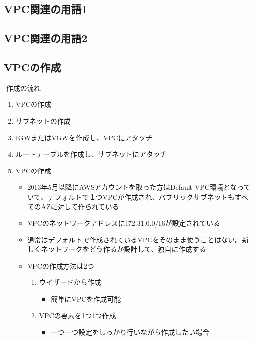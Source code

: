 \documentclass[11pt]{article}
\begin{document}
\subsection{VPC関連の用語1}
\label{sec-1-3}
\subsection{VPC関連の用語2}
\label{sec-1-4}
\subsection{VPCの作成}
\label{sec-1-5}

  -作成の流れ
\begin{enumerate}
\item VPCの作成
\item サブネットの作成
\item IGWまたはVGWを作成し、VPCにアタッチ
\item ルートテーブルを作成し、サブネットにアタッチ
\item VPCの作成
\begin{itemize}
\item 2013年5月以降にAWSアカウントを取った方はDefault VPC環境となっていて、デフォルトで１つVPCが作成され、パブリックサブネットもすべてのAZに対して作られている
\item VPCのネットワークアドレスに172.31.0.0/16が設定されている
\item 通常はデフォルトで作成されているVPCをそのまま使うことはない。新しくネットワークをどう作るか設計して、独自に作成する
\item VPCの作成方法は2つ
\begin{enumerate}
\item ウイザードから作成
\begin{itemize}
\item 簡単にVPCを作成可能
\end{itemize}
\item VPCの要素を1つ1つ作成
\begin{itemize}
\item 一つ一つ設定をしっかり行いながら作成したい場合
\end{itemize}
\end{enumerate}
\end{itemize}
\end{enumerate}
\section{}
\end{document}
